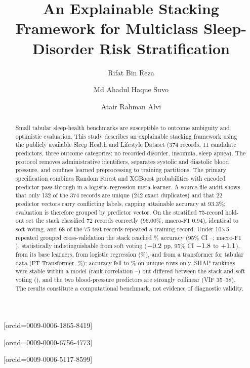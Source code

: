 \documentclass[a4paper,fleqn]{cas-dc}
\begin{document}
\raggedbottom
\shorttitle{}
\shortauthors{}
\title[mode=title]{An Explainable Stacking Framework for Multiclass Sleep-Disorder Risk Stratification}
\author[1]{Rifat Bin Reza}[orcid=0009-0006-1865-8419]
\cormark[1]
\author[2]{Md Ahadul Haque Suvo}[orcid=0009-0000-6756-4773]
\author[1]{Atair Rahman Alvi}[orcid=0009-0006-5117-8599]
\address[1]{BSRM School of Engineering, Department of Electrical and Electronics Engineering, Brac University, Dhaka, Bangladesh\label{affa}}
\address[2]{Aviation and Aerospace University, Department of Avionics Engineering, Dhaka, Bangladesh}
\begin{abstract}
Small tabular sleep-health benchmarks are susceptible to outcome ambiguity and optimistic evaluation. This study describes an explainable stacking framework using the publicly available Sleep Health and Lifestyle Dataset (374 records, 11 candidate predictors, three outcome categories: no recorded disorder, insomnia, sleep apnea). The protocol removes administrative identifiers, separates systolic and diastolic blood pressure, and confines learned preprocessing to training partitions. The primary specification combines Random Forest and XGBoost probabilities with encoded predictor pass-through in a logistic-regression meta-learner. A source-file audit shows that only 132 of the 374 records are unique (242 exact duplicates) and that 22 predictor vectors carry conflicting labels, capping attainable accuracy at 93.3\%; evaluation is therefore grouped by predictor vector. On the stratified 75-record hold-out set the stack classified 72 records correctly (96.00\%, macro-F1 0.94), identical to soft voting, and 68 of the 75 test records repeated a training record. Under 10$\times$5 repeated grouped cross-validation the stack reached \AccStackG\% accuracy (95\% CI \CIloStackG--\CIhiStackG; macro-F1 \FStackG), statistically indistinguishable from soft voting ($-0.2$ pp, 95\% CI $-1.8$ to $+1.1$), from its base learners, from logistic regression (\AccLRG\%), and from a transformer for tabular data (FT-Transformer, \AccFTTG\%); accuracy fell to \AccStackD\% on unique rows only. SHAP rankings were stable within a model (rank correlation \ShapRhoVote--\ShapRhoStack) but differed between the stack and soft voting (\ShapStackVote), and the two blood-pressure predictors are strongly collinear (VIF 35--38). The results constitute a computational benchmark, not evidence of diagnostic validity.
\end{abstract}
\end{document}
